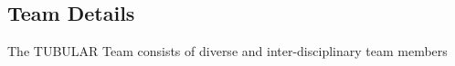 \subsection{Team Details}
The TUBULAR Team consists of diverse and inter-disciplinary team members 

\bigskip

